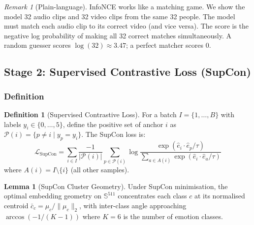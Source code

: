 \documentclass[12pt,a4paper]{article}
\theoremstyle{definition}
\newtheorem{lemma}[theorem]{Lemma}
\newtheorem{definition}[theorem]{Definition}
\theoremstyle{remark}
\newtheorem{remark}[theorem]{Remark}
\begin{document}
\begin{remark}[Plain-language]
InfoNCE works like a matching game. We show the model 32 audio clips and
32 video clips from the same 32 people. The model must match each audio clip
to its correct video (and vice versa). The score is the negative log
probability of making all 32 correct matches simultaneously.
A random guesser scores $\log(32) \approx 3.47$; a perfect matcher scores 0.
\end{remark}

\subsection{Stage 2: Supervised Contrastive Loss (SupCon)}

\subsubsection{Definition}

\begin{definition}[Supervised Contrastive Loss]
For a batch $I = \{1, \ldots, B\}$ with labels $y_i \in \{0,\ldots,5\}$,
define the positive set of anchor $i$ as
$\mathcal{P}(i) = \{p \neq i \mid y_p = y_i\}$.
The SupCon loss is:
\[
  \mathcal{L}_{\text{SupCon}} =
  \sum_{i \in I} \frac{-1}{|\mathcal{P}(i)|}
  \sum_{p \in \mathcal{P}(i)}
  \log\frac{\exp(\hat{e}_i \cdot \hat{e}_p / \tau)}
           {\sum_{a \in A(i)} \exp(\hat{e}_i \cdot \hat{e}_a / \tau)}
\]
where $A(i) = I \setminus \{i\}$ (all other samples).
\end{definition}

\begin{lemma}[SupCon Cluster Geometry]
Under SupCon minimisation, the optimal embedding geometry on
$\mathbb{S}^{511}$ concentrates each class $c$ at its normalised centroid
$\bar{c}_c = \mu_c/\|\mu_c\|_2$, with inter-class angle approaching
$\arccos(-1/(K-1))$ where $K=6$ is the number of emotion classes.
\end{lemma}
\end{document}
